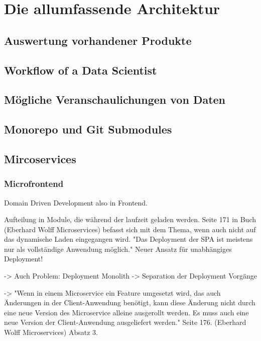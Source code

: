 \chapter{Die allumfassende Architektur}
\label{chap:die-allumfassende-architektur}

\section{Auswertung vorhandener Produkte}

\section{Workflow of a Data Scientist}

\section{Mögliche Veranschaulichungen von Daten}

\section{Monorepo und Git Submodules}

\section{Mircoservices}

\subsection{Microfrontend}
Domain Driven Development also in Frontend.

Aufteilung in Module, die während der laufzeit geladen werden.
Seite 171 in Buch (Eberhard Wolff Microservices) befasst sich mit dem
Thema, wenn auch nicht auf das dynamische Laden eingegangen wird.
"Das Deployment der SPA ist meistens nur als vollständige Anwendung möglich."
Neuer Ansatz für unabhängiges Deployment!

-> Auch Problem: Deployment Monolith -> Separation der Deployment Vorgänge

-> "Wenn in einem Microservice ein Feature umgesetzt wird, das auch Änderungen
in der Client-Anwendung benötigt, kann diese Änderung nicht durch eine neue
Version des Microservice alleine ausgerollt werden. Es muss auch eine neue Version
der Client-Anwendung ausgeliefert werden." Seite 176.  (Eberhard Wolff Microservices)
Absatz 3.

